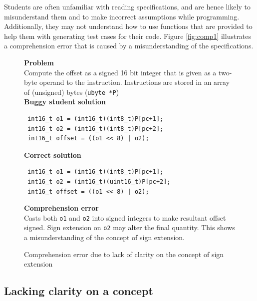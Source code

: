 \documentclass{sig-alternate}
\begin{document}
Students are often unfamiliar with reading specifications, and are
hence likely to misunderstand them and to make incorrect assumptions
while programming. Additionally, they may not understand how to use
functions that are provided to help them with generating test cases
for their code. Figure \ref{fig:comp1} illustrates a comprehension
error that is caused by a misunderstanding of the specifications.

\begin{figure}
\begin{framed}
\setlength{\parindent}{0cm}
\textbf{Problem}\\

Compute the offset as a signed 16 bit integer that is given as a
two-byte operand to the instruction. Instructions are stored in an
array of (unsigned) bytes (\verb|ubyte *P|) \\

\textbf{Buggy student solution}
\vspace{-0.05in}
\begin{verbatim}
 int16_t o1 = (int16_t)(int8_t)P[pc+1];
 int16_t o2 = (int16_t)(int8_t)P[pc+2];
 int16_t offset = ((o1 << 8) | o2);
\end{verbatim}

\textbf{Correct solution}
\vspace{-0.05in}
\begin{verbatim}
 int16_t o1 = (int16_t)(int8_t)P[pc+1];
 int16_t o2 = (int16_t)(uint16_t)P[pc+2];
 int16_t offset = ((o1 << 8) | o2);
\end{verbatim}

\textbf{Comprehension error}\\

Casts both \verb|o1| and \verb|o2| into signed integers to make
resultant offset signed. Sign extension on \verb|o2| may alter the
final quantity. This shows a misunderstanding of the concept of sign
extension.

\end{framed}
\vspace{-0.1in}
\caption{Comprehension error due to lack of clarity on the concept of sign extension}
\label{fig:comp2}

\end{figure}


\subsection{Lacking clarity on a concept}
\label{sec:comp2}
\end{document}

